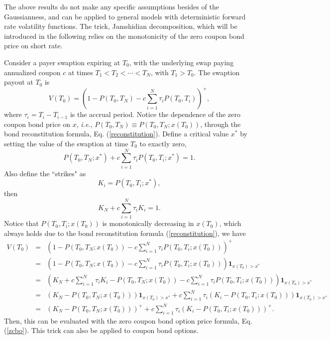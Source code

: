 \documentclass[12pt]{article}
\begin{document}
  The above results do not make any specific assumptions besides of the Gaussianness, and can be applied to general models with
  deterministic forward rate volatility functions. The trick, Jamshidian decomposition,
  which will be introduced in the following relies on the monotonicity of the zero coupon bond price on short rate.

  Consider a payer swaption expiring at $T_0$, with the underlying swap paying annualized coupon $c$ at times
  $T_1<T_2<\cdots<T_N$, with $T_1>T_0$. The swaption payout at $T_0$ is
  \begin{equation}
    V(T_0) = \left(1-P(T_0,T_N)-c\sum_{i=1}^N\tau_iP(T_0,T_i)\right)^+,
  \end{equation}
  where $\tau_i=T_i-T_{i-1}$ is the accrual period. Notice the dependence of the zero coupon bond price on $x$, {\it i.e.},
  $P(T_0,T_N)\equiv P(T_0,T_N;x(T_0))$, through the bond reconstitution formula, Eq. (\ref{reconstitution}). Define a
  critical value $x^*$ by setting the value of the swaption at time $T_0$ to exactly zero,
  \begin{equation}
    P(T_0,T_N;x^*)+c\sum_{i=1}^N\tau_iP(T_0,T_i;x^*)=1.
  \end{equation}
  Also define the ``strikes" as
  \begin{equation}
    K_i=P(T_0,T_i;x^*),
  \end{equation}
  then
  \begin{equation}
    K_N+c\sum_{i=1}^N\tau_iK_i=1.
  \end{equation}
  Notice that $P(T_0,T_i;x(T_0))$ is monotonically decreasing in $x(T_0)$, which always holds due to the bond reconstitution
  formula (\ref{reconstitution}), we have
  \begin{eqnarray}
    V(T_0)&=&\left(1-P(T_0,T_N;x(T_0))-c\sum_{i=1}^N\tau_iP(T_0,T_i;x(T_0))\right)^+\nonumber\\
          &=&\left(1-P(T_0,T_N;x(T_0))-c\sum_{i=1}^N\tau_iP(T_0,T_i;x(T_0))\right)\textbf{1}_{x(T_0)>x^*}\nonumber\\
          &=&\left(K_N+c\sum_{i=1}^N\tau_iK_i-P(T_0,T_N;x(T_0))-c\sum_{i=1}^N\tau_iP(T_0,T_i;x(T_0))\right)\textbf{1}_{x(T_0)>x^*}\nonumber\\
          &=&\left(K_N-P(T_0,T_N;x(T_0))\right)\textbf{1}_{x(T_0)>x^*}
                    + c\sum_{i=1}^N\tau_i\left(K_i-P(T_0,T_i;x(T_0))\right)\textbf{1}_{x(T_0)>x^*}\nonumber\\
          &=&\left(K_N-P(T_0,T_N;x(T_0))\right)^+
       + c\sum_{i=1}^N\tau_i\left(K_i-P(T_0,T_i;x(T_0))\right)^+.
  \end{eqnarray}
  Then, this can be evaluated with the zero coupon bond option price formula, Eq. (\ref{zcbo}).
  This trick can also be applied to coupon bond options.
\end{document}
